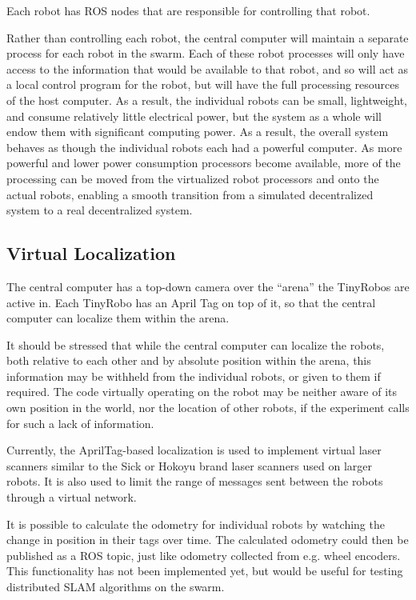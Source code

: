 \documentclass[]{article}
\begin{document}
Each robot has ROS nodes that are responsible for controlling that robot. 

Rather than controlling each robot, the central computer will maintain a separate process for each robot in the swarm. 
Each of these robot processes will only have access to the information that would be available to that robot, and so will act as a local control program for the robot, but will have the full processing resources of the host computer. 
As a result, the individual robots can be small, lightweight, and consume relatively little electrical power, but the system as a whole will endow them with significant computing power. 
As a result, the overall system behaves as though the individual robots each had a powerful computer. 
As more powerful and lower power consumption processors become available, more of the processing can be moved from the virtualized robot processors and onto the actual robots, enabling a smooth transition from a simulated decentralized system to a real decentralized system. 

\subsection{Virtual Localization}

The central computer has a top-down camera over the ``arena'' the TinyRobos are active in. 
Each TinyRobo has an April Tag  on top of it, so that the central computer can localize them within the arena. 

It should be stressed that while the central computer can localize the robots, both relative to each other and by absolute position within the arena, this information may be withheld from the individual robots, or given to them if required. 
The code virtually operating on the robot may be neither aware of its own position in the world, nor the location of other robots, if the experiment calls for such a lack of information. 

Currently, the AprilTag-based localization is used to implement virtual laser scanners similar to the Sick or Hokoyu brand laser scanners used on larger robots. 
It is also used to limit the range of messages sent between the robots through a virtual network. 

It is possible to calculate the odometry for individual robots by watching the change in position in their tags over time. 
The calculated odometry could then be published as a ROS topic, just like odometry collected from e.g. wheel encoders. 
This functionality has not been implemented yet, but would be useful for testing distributed SLAM algorithms on the swarm. 
\end{document}
